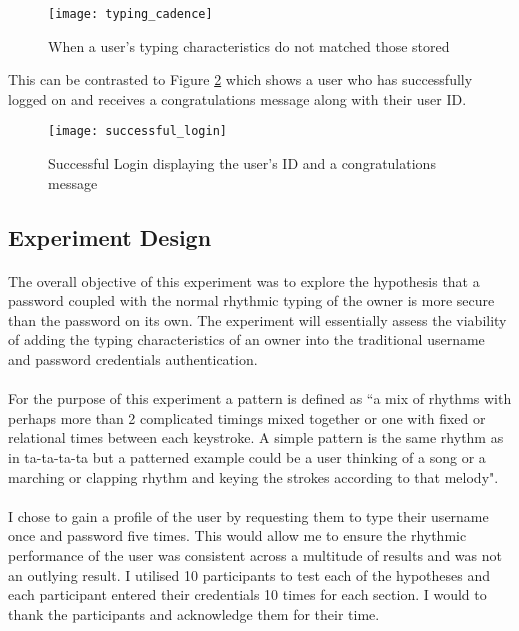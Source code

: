 \documentclass{article}
\begin{document}
\begin{figure}[H]
    \centering
    \texttt{[image: typing\_cadence]}
    \caption{When a user's typing characteristics do not matched those stored}
    \label{fig:typing_cadence}
\end{figure}

This can be contrasted to Figure \ref{fig:successful_login} which shows a user who has successfully logged on and receives a congratulations message along with their user ID.

\begin{figure}[H]
    \centering
    \texttt{[image: successful\_login]}
    \caption{Successful Login displaying the user's ID and a congratulations message}
    \label{fig:successful_login}
\end{figure}

\subsection{Experiment Design}
\paragraph{}
The overall objective of this experiment was to explore the hypothesis that a password coupled with the normal rhythmic typing of the owner is more secure than the password on its own. The experiment will essentially assess the viability of adding the typing characteristics of an owner into the traditional username and password credentials authentication. 

\paragraph{}
For the purpose of this experiment a pattern is defined as ``a mix of rhythms with perhaps more than 2 complicated timings mixed together or one with fixed or relational times between each keystroke. A simple pattern is the same rhythm as in ta-ta-ta-ta but a patterned example could be a user thinking of a song or a marching or clapping rhythm and keying the strokes according to that melody". 

\paragraph{}
I chose to gain a profile of the user by requesting them to type their username once and password five times. This would allow me to ensure the rhythmic performance of the user was consistent across a multitude of results and was not an outlying result. I utilised 10 participants to test each of the hypotheses and each participant entered their credentials 10 times for each section. I would to thank the participants and acknowledge them for their time.
\end{document}
